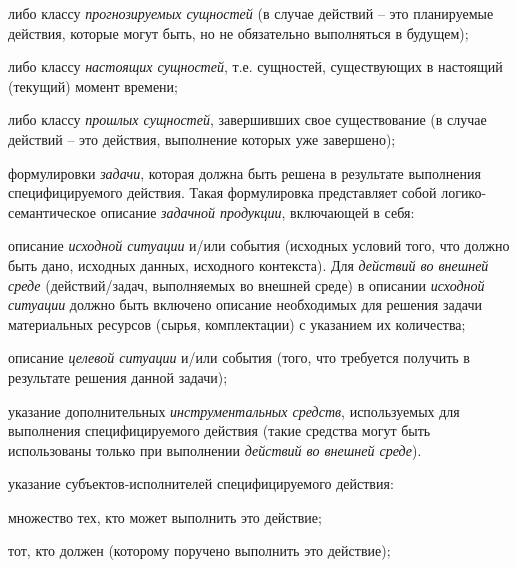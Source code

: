 \begin{SCn}
\begin{scnsubstruct}
{\begin{scnitemize}
                \begin{scnitemizeii}
                    \item либо классу \textit{прогнозируемых сущностей} (в случае действий -- это планируемые действия, которые могут быть, но не обязательно выполняться в будущем);
                    \item либо классу \textit{настоящих сущностей}, т.е. сущностей, существующих в настоящий (текущий) момент времени;
                    \item либо классу \textit{прошлых сущностей}, завершивших свое существование (в случае действий -- это действия, выполнение которых уже завершено);
                \end{scnitemizeii}
                \item формулировки \textit{задачи}, которая должна быть решена в результате выполнения специфицируемого действия. Такая формулировка представляет собой логико-семантическое описание \textit{задачной продукции}, включающей в себя:
                \begin{scnitemizeii}
                    \item описание \textit{исходной ситуации} и/или события (исходных условий того, что должно быть дано, исходных данных, исходного контекста). Для \textit{действий во внешней среде} (действий/задач, выполняемых во внешней среде) в описании \textit{исходной ситуации} должно быть включено описание необходимых для решения задачи материальных ресурсов (сырья, комплектации) с указанием их количества;
                    \item описание \textit{целевой ситуации} и/или события (того, что требуется получить в результате решения данной задачи);
                    \item указание дополнительных \textit{инструментальных средств}, используемых для выполнения специфицируемого действия (такие средства могут быть использованы только при выполнении \textit{действий во внешней среде}).
                \end{scnitemizeii}
                \item указание субъектов-исполнителей специфицируемого действия:
                \begin{scnitemizeii}
                    \item множество тех, кто может выполнить это действие;
                    \item тот, кто должен (которому поручено выполнить это действие);
                \end{scnitemizeii}

\end{scnitemize}}
\end{scnsubstruct}
\end{SCn}

